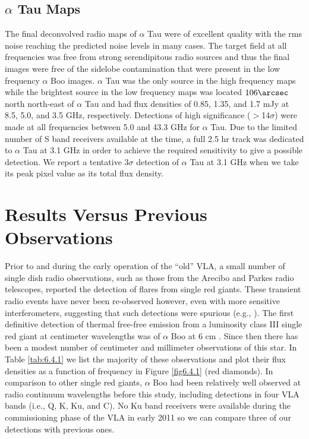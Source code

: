 \subsection{$\alpha$ Tau Maps}\label{sec:6.2.2}
The final deconvolved radio maps of $\alpha$ Tau were of excellent quality with the rms noise reaching the predicted noise levels in many cases. The target field at all frequencies was free from strong serendipitous radio sources and thus the final images were free of the sidelobe contamination that were present in the low frequency $\alpha$ Boo images. $\alpha$ Tau was the only source in the high frequency maps while the brightest source in the low frequency maps was located $106\arcsec$ north north-east of $\alpha$ Tau and had flux densities of 0.85, 1.35, and 1.7 mJy at 8.5, 5.0, and 3.5 GHz, respectively. Detections of high significance ($>$14$\sigma$) were made at all frequencies between 5.0 and 43.3 GHz for $\alpha$ Tau. Due to the limited number of S band receivers available at the time, a full 2.5 hr track was dedicated to $\alpha$ Tau at 3.1 GHz in order to achieve the required sensitivity to give a possible detection. We report a tentative $3\sigma$ detection of $\alpha$ Tau at 3.1 GHz when we take its peak pixel value as its total flux density.

\section{Results Versus Previous Observations}\label{sec:6.4}
Prior to and during the early operation of the ``old'' VLA, a small number of single dish radio observations, such as those from the Arecibo \citep{boice_1981} and Parkes \citep{slee_1989} radio telescopes, reported the detection of flares from single red giants. These transient radio events have never been re-observed however, even with more sensitive interferometers, suggesting that such detections were spurious (e.g., \citealt{beasley_1992}). The first definitive detection of thermal free-free emission from a luminosity class III single red giant at centimeter wavelengths was of $\alpha$ Boo at 6 cm \citep{drake_1983,drake_1986}. Since then there has been a modest number of centimeter and millimeter observations of this star. In Table \ref{tab:6.4.1} we list the majority of these observations and plot their flux densities as a function of frequency in Figure \ref{fig6.4.1} (red diamonds). In comparison to other single red giants, $\alpha$ Boo had been relatively well observed at radio continuum wavelengths before this study, including detections in four VLA bands (i.e., Q, K, Ku, and C). No Ku band receivers were available during the commissioning phase of the VLA in early 2011 so we can compare three of our detections with previous ones.

